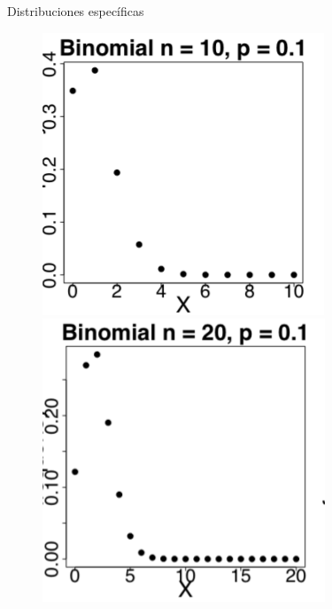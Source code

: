 \documentclass[10pt]{beamer}
\begin{document}
\begin{frame}{Distribuciones espec\'ificas}
\begin{figure}
	\centering
	\begin{minipage}{.3\textwidth}
		\includegraphics[width=0.8\linewidth]{v13}	
	\end{minipage}
	\begin{minipage}{.3\textwidth}
		\centering
		\includegraphics[width=0.8\linewidth]{v14}
	\end{minipage}
	\begin{minipage}{.3\textwidth}
		\centering

\end{minipage}
\end{figure}
\end{frame}
\end{document}

